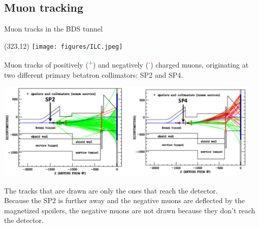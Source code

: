 \documentclass[xcolor={dvipsnames}]{beamer}
\newcommand{\ilclogo}{
  \setlength{\TPHorizModule}{1pt}
  \setlength{\TPVertModule}{1pt}
  \begin{textblock}{1}(323,12)
   \texttt{[image: figures/ILC.jpeg]}
  \end{textblock}
}
\begin{document}
\subsection{Muon tracking}
\begin{frame}{Muon tracks in the BDS tunnel}
\ilclogo
Muon tracks of positively (\textcolor{green}{\textmu\textsuperscript{+}}) and negatively (\textcolor{red}{\textmu\textsuperscript{-}}) charged muons, originating at two different primary betatron collimators: SP2 and SP4.
\begin{center}
\includegraphics[width=0.95\textwidth]{Muon_tracks.pdf}
\end{center}
The tracks that are drawn are only the ones that reach the detector.\\
Because the SP2 is further away and the negative muons are deflected by the magnetized spoilers, the negative muons are not drawn because they don't reach the detector.
\end{frame}
\end{document}
